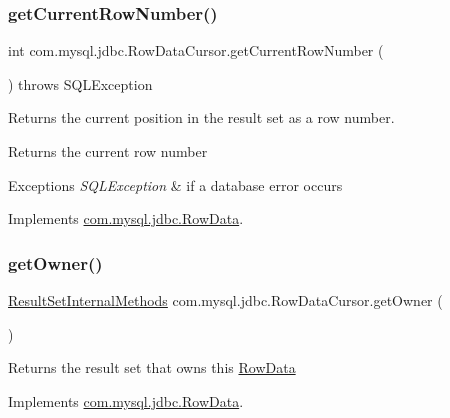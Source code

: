 \subsubsection{\texorpdfstring{get\+Current\+Row\+Number()}{getCurrentRowNumber()}}
{\footnotesize\ttfamily int com.\+mysql.\+jdbc.\+Row\+Data\+Cursor.\+get\+Current\+Row\+Number (\begin{DoxyParamCaption}{ }\end{DoxyParamCaption}) throws S\+Q\+L\+Exception}

Returns the current position in the result set as a row number.

\begin{DoxyReturn}{Returns}
the current row number 
\end{DoxyReturn}

\begin{DoxyExceptions}{Exceptions}
{\em S\+Q\+L\+Exception} & if a database error occurs \\
\hline
\end{DoxyExceptions}


Implements \mbox{\hyperlink{interfacecom_1_1mysql_1_1jdbc_1_1_row_data_aec8ec45fafa52ded12507aa708efbdf7}{com.\+mysql.\+jdbc.\+Row\+Data}}.

\mbox{\label{classcom_1_1mysql_1_1jdbc_1_1_row_data_cursor_a82d9aac57045528a72f5d979fe7490bd}} 
\subsubsection{\texorpdfstring{get\+Owner()}{getOwner()}}
{\footnotesize\ttfamily \mbox{\hyperlink{interfacecom_1_1mysql_1_1jdbc_1_1_result_set_internal_methods}{Result\+Set\+Internal\+Methods}} com.\+mysql.\+jdbc.\+Row\+Data\+Cursor.\+get\+Owner (\begin{DoxyParamCaption}{ }\end{DoxyParamCaption})}

Returns the result set that \textquotesingle{}owns\textquotesingle{} this \mbox{\hyperlink{interfacecom_1_1mysql_1_1jdbc_1_1_row_data}{Row\+Data}} 

Implements \mbox{\hyperlink{interfacecom_1_1mysql_1_1jdbc_1_1_row_data_adb65eef9f8713ed4c3a1eb67eafaaf86}{com.\+mysql.\+jdbc.\+Row\+Data}}.

